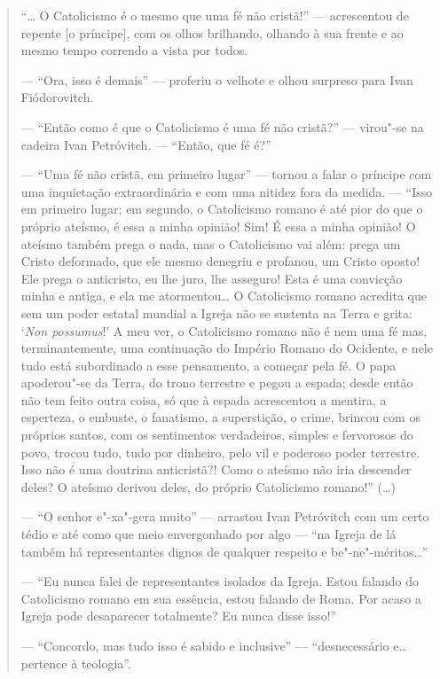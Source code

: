 \begin{quote}
``\ldots{} O Catolicismo é o mesmo que uma fé não cristã!'' --- acrescentou
de repente [o príncipe], com os olhos brilhando,
olhando à sua frente e ao mesmo tempo correndo a vista por todos.

--- ``Ora, isso é demais'' --- proferiu o velhote e olhou surpreso
para Ivan Fiódorovitch.

--- ``Então como é que o Catolicismo é uma fé não
cristã?'' --- virou"-se na cadeira Ivan Petróvitch. --- ``Então, que fé é?''

--- ``Uma fé não cristã, em primeiro lugar'' --- tornou a falar o
príncipe com uma inquietação extraordinária e com uma nitidez fora da
medida. --- ``Isso em primeiro lugar; em segundo, o Catolicismo romano é
até pior do que o próprio ateísmo, é essa a minha opinião! Sim! É essa a
minha opinião! O ateísmo também prega o nada, mas o Catolicismo vai
além: prega um Cristo deformado, que ele mesmo denegriu e profanou, um
Cristo oposto! Ele prega o anticristo, eu lhe juro, lhe asseguro! Esta é
uma convicção minha e antiga, e ela me atormentou\ldots{} O Catolicismo romano
acredita que sem um poder estatal mundial a Igreja não se sustenta na
Terra e grita: `\emph{Non possumus}!' A meu ver, o Catolicismo romano não é
nem uma fé mas, terminantemente, uma continuação do Império Romano do
Ocidente, e nele tudo está subordinado a esse pensamento, a começar pela
fé. O papa apoderou"-se da Terra, do trono terrestre e pegou a espada;
desde então não tem feito outra coisa, só que à espada acrescentou a
mentira, a esperteza, o embuste, o fanatismo, a superstição, o crime,
brincou com os próprios santos, com os sentimentos verdadeiros, simples
e fervorosos do povo, trocou tudo, tudo por dinheiro, pelo vil e
poderoso poder terrestre. Isso não é uma doutrina anticristã?! Como o
ateísmo não iria descender deles? O ateísmo derivou deles, do próprio
Catolicismo romano!'' (\ldots{})

--- ``O senhor e"-xa"-gera muito'' --- arrastou Ivan Petróvitch com um
certo tédio e até como que meio envergonhado por algo --- ``na Igreja de
lá também há representantes dignos de qualquer respeito e
be"-ne"-méritos\ldots{}''

--- ``Eu nunca falei de representantes isolados da Igreja. Estou
falando do Catolicismo romano em sua essência, estou falando de Roma.
Por acaso a Igreja pode desaparecer totalmente? Eu nunca disse isso!''

--- ``Concordo, mas tudo isso é sabido e inclusive'' ---
``desnecessário e\ldots{} pertence à teologia''.


\end{quote}
